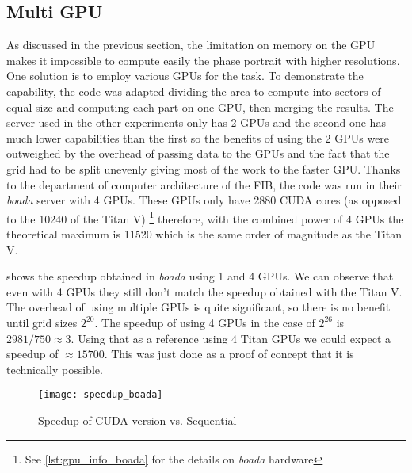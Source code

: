 \subsection{Multi GPU}
\label{sub:multi-gpu}

As discussed in the previous section, the limitation on memory on the GPU makes it impossible to compute easily the phase portrait with higher resolutions. One solution is to employ various GPUs for the task. To demonstrate the capability, the code was adapted dividing the area to compute into sectors of equal size and computing each part on one GPU, then merging the results. The server used in the other experiments only has 2 GPUs and the second one has much lower capabilities than the first so the benefits of using the 2 GPUs were outweighed by the overhead of passing data to the GPUs and the fact that the grid had to be split unevenly giving most of the work to the faster GPU. Thanks to the department of computer architecture of the FIB, the code was run in their \emph{boada} server with 4 GPUs. These GPUs only have 2880 CUDA cores (as opposed to the 10240 of the Titan V) \footnote{See \cref{lst:gpu_info_boada} for the details on \emph{boada} hardware} therefore, with the combined power of 4 GPUs the theoretical maximum is 11520 which is the same order of magnitude
as the Titan V.

 shows the speedup obtained in \emph{boada} using 1 and 4 GPUs. We can observe that even with 4 GPUs they still don't match the speedup obtained with the Titan V. The overhead of using multiple GPUs is quite significant, so there is no benefit until grid sizes $2^{20}$. The speedup of using 4 GPUs in the case of
$2^{26}$ is $2981/750 \approx 3$. Using that as a reference using 4 Titan GPUs we could expect a speedup of $\approx 15700$. This was just done as a proof of concept that it is technically possible.

\begin{figure}[H]
    \centering
    \texttt{[image: speedup\_boada]}
    \caption{Speedup of CUDA version vs. Sequential}%
    \label{fig:speedup_boada}
\end{figure}
